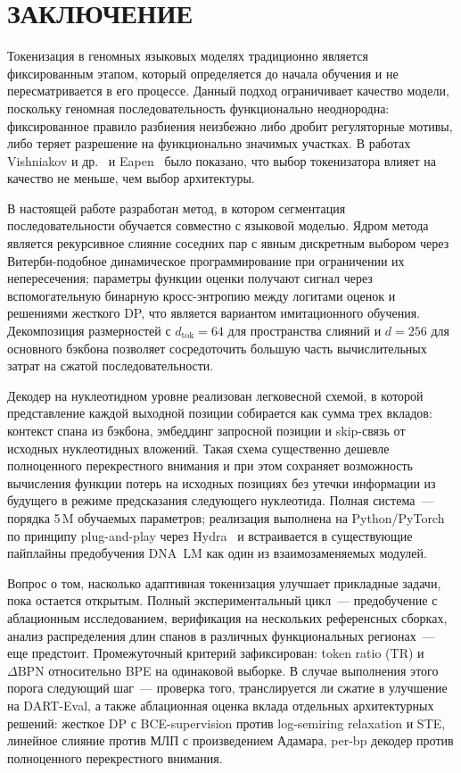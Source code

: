 \chapter*{ЗАКЛЮЧЕНИЕ}

Токенизация в геномных языковых моделях традиционно является
фиксированным этапом, который определяется до начала обучения и не
пересматривается в его процессе. Данный подход ограничивает качество
модели, поскольку геномная последовательность функционально
неоднородна: фиксированное правило разбиения неизбежно либо дробит
регуляторные мотивы, либо теряет разрешение на функционально значимых
участках. В работах Vishniakov и
др.~\cite{vishniakovGenomicFoundationlessModels2024} и
Eapen~\cite{eapenGenomicTokenizerBiologydriven2025} было показано,
что выбор токенизатора влияет на качество не меньше, чем выбор
архитектуры.

В настоящей работе разработан метод, в котором сегментация
последовательности обучается совместно с языковой моделью. Ядром
метода является рекурсивное слияние соседних пар с явным дискретным
выбором через Витерби-подобное динамическое программирование при
ограничении их непересечения; параметры функции оценки получают
сигнал через вспомогательную бинарную кросс-энтропию между логитами
оценок и решениями жесткого DP, что является вариантом имитационного
обучения. Декомпозиция размерностей с $d_{\text{tok}} = 64$ для
пространства слияний и $d = 256$ для основного бэкбона позволяет
сосредоточить большую часть вычислительных затрат на сжатой
последовательности.

Декодер на нуклеотидном уровне реализован легковесной схемой, в
которой представление каждой выходной позиции собирается как сумма
трех вкладов: контекст спана из бэкбона, эмбеддинг запросной позиции
и skip-связь от исходных нуклеотидных вложений. Такая схема существенно
дешевле полноценного перекрестного внимания и при этом сохраняет
возможность вычисления функции потерь на исходных позициях без утечки
информации из будущего в режиме предсказания следующего нуклеотида.
Полная система~--- порядка 5\,M обучаемых параметров; реализация выполнена на
Python/PyTorch~\cite{paszke2019pytorchimperativestylehighperformance}
по принципу plug-and-play через
Hydra~\cite{yadanHydraConfigFramework2019} и встраивается в
существующие пайплайны предобучения DNA~LM как один из взаимозаменяемых
модулей.

Вопрос о том, насколько адаптивная токенизация улучшает прикладные
задачи, пока остается открытым. Полный экспериментальный цикл~---
предобучение с аблационным исследованием, верификация на нескольких
референсных сборках, анализ распределения длин спанов в различных
функциональных регионах~--- еще предстоит. Промежуточный критерий
зафиксирован: token ratio ($\mathrm{TR}$) и $\Delta\mathrm{BPN}$
относительно BPE на одинаковой выборке. В случае выполнения этого
порога следующий шаг~--- проверка того, транслируется ли сжатие в
улучшение на DART-Eval, а также аблационная оценка вклада отдельных
архитектурных решений: жесткое DP с BCE-supervision против
log-semiring relaxation и STE, линейное слияние против МЛП с
произведением Адамара, per-bp декодер против полноценного
перекрестного внимания.
